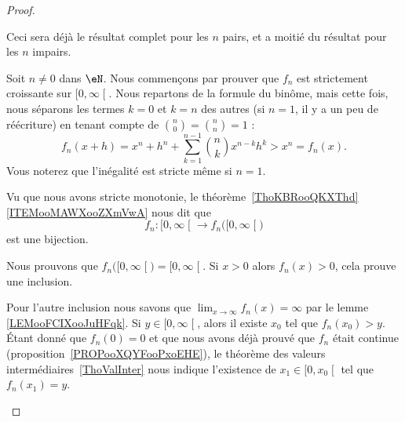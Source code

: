 \begin{proof}
\begin{subproof}
        \item[Pour \( n\) pair ou impair, bijection sur les positifs]
            Ceci sera déjà le résultat complet pour les \( n\) pairs, et a moitié du résultat pour les \( n\) impairs.
            \begin{subproof}
                \item[Stricte croissance]
                    Soit \( n\neq 0\) dans \( \eN\). Nous commençons par prouver que \( f_n\) est strictement croissante sur \( \mathopen[ 0 , \infty \mathclose[\). Nous repartons de la formule du binôme, mais cette fois, nous séparons les termes \( k=0\) et \( k=n\) des autres (si \( n=1\), il y a un peu de réécriture) en tenant compte de \( {n\choose 0}={n\choose n}=1\) :
                        \begin{equation}
                            f_n(x+h)=x^n+h^n+\sum_{k=1}^{n-1}{n\choose k}x^{n-k}h^k>x^n=f_n(x).
                        \end{equation}
                        Vous noterez que l'inégalité est stricte même si \( n=1\).

                        Vu que nous avons stricte monotonie, le théorème~\ref{ThoKBRooQKXThd}\ref{ITEMooMAWXooZXmVwA} nous dit que
                        \begin{equation}
                            f_n\colon \mathopen[ 0 , \infty \mathclose[\to f_n\big( \mathopen[ 0 , \infty \mathclose[ \big)
                        \end{equation}
                        est une bijection.
                    \item[Bijection]

                        Nous prouvons que \( f_n\big( \mathopen[ 0 , \infty \mathclose[ \big)=\mathopen[ 0 , \infty \mathclose[\). Si \( x>0\) alors \( f_n(x)>0\), cela prouve une inclusion.

                            Pour l'autre inclusion nous savons que \( \lim_{x\to \infty} f_n(x)=\infty\) par le lemme \ref{LEMooFCIXooJuHFqk}. Si \( y\in \mathopen[ 0 , \infty \mathclose[\), alors il existe \( x_0\) tel que \( f_n(x_0)>y\). Étant donné que \( f_n(0)=0\) et que nous avons déjà prouvé que \( f_n\) était continue (proposition~\ref{PROPooXQYFooPxoEHE}), le théorème des valeurs intermédiaires~\ref{ThoValInter} nous indique l'existence de \( x_1\in \mathopen[ 0 , x_0 \mathclose[\) tel que \( f_n(x_1)=y\).

            \end{subproof}


\end{subproof}
\end{proof}
